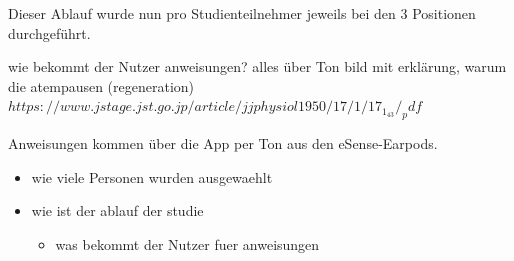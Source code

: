 
Dieser Ablauf wurde nun pro Studienteilnehmer jeweils bei den 3 Positionen durchgeführt.


wie bekommt der Nutzer anweisungen? alles über Ton
bild mit erklärung, warum die atempausen (regeneration) $https://www.jstage.jst.go.jp/article/jjphysiol1950/17/1/17_1_43/_pdf$

Anweisungen kommen über die App per Ton aus den eSense-Earpods.

\begin{itemize}
    \item wie viele Personen wurden ausgewaehlt
    \item wie ist der ablauf der studie
    \begin{itemize}
        \item was bekommt der Nutzer fuer anweisungen
    \end{itemize}
\end{itemize}
